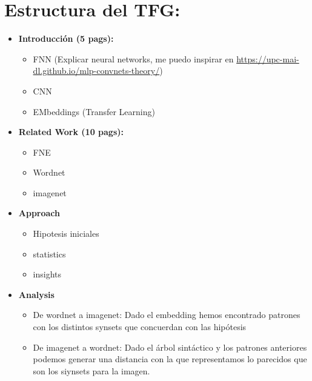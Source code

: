 \documentclass[12,twoside]{TFG-GM}
\theoremstyle{definition}
\theoremstyle{remark}
\begin{document}
\maketitle

\section{Estructura del TFG: }

\begin{itemize}
\item \textbf{Introducción (5 pags): }
\begin{itemize}
\item FNN (Explicar neural networks, me puedo inspirar en \url{https://upc-mai-dl.github.io/mlp-convnets-theory/})
\item CNN 
\item EMbeddings  (Transfer Learning)
\end{itemize}
\item \textbf{Related Work (10 pags):}
\begin{itemize}
\item FNE 
\item Wordnet 
\item imagenet 
\end{itemize}
\item \textbf{Approach }
\begin{itemize}
\item Hipotesis iniciales 
\item statistics 
\item insights 
\end{itemize}
\item \textbf{Analysis}
\begin{itemize}
\item De wordnet a imagenet: Dado el embedding hemos encontrado patrones con los distintos synsets que concuerdan con las hipótesis
\item De imagenet a wordnet: Dado el árbol sintáctico y los patrones anteriores podemos generar una distancia con la que representamos lo parecidos que son los siynsets para la imagen. 
\end{itemize}
\end{itemize}

\newpage
\end{document}
